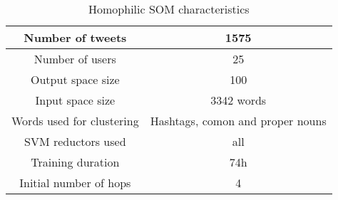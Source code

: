 \begin{table}[H]
  \caption{Homophilic SOM characteristics}
  \label{tab:homosom}
  \begin{center}
    \begin{tabular}{|c|c|}
      \hline
      Number of tweets & 1575 \\
      \hline
      Number of users & 25  \\
      \hline
      Output space size        & 100 \\
      \hline
      Input space size       & 3342 words  \\
      \hline
      Words used for clustering & Hashtags, comon and proper nouns  \\
      \hline
      SVM reductors used & all  \\
      \hline
      Training duration & 74h \\
      \hline
      Initial number of hops & 4 \\
      \hline
    \end{tabular}
  \end{center}
\end{table}
